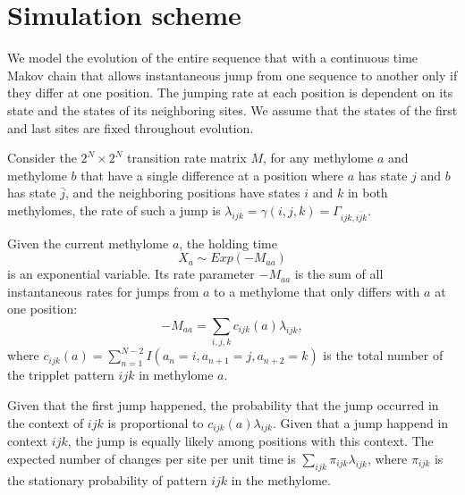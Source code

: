 \documentclass[11pt]{article}
\begin{document}
\section{Simulation scheme}

We model the evolution of the entire sequence that with a continuous
time Makov chain that allows instantaneous jump from one sequence to
another only if they differ at one position. The jumping rate at each
position is dependent on its state and the states of its neighboring
sites. We assume that the states of the first and last sites are
fixed throughout evolution.

Consider the $2^N \times 2^N$ transition rate matrix $M$, for any
methylome $a$ and methylome $b$ that have a single difference at a
position where $a$ has state $j$ and $b$ has state $\bar{j}$, and the
neighboring positions have states $i$ and $k$ in both methylomes, the
rate of such a jump is $\lambda_{ijk} = \gamma(i, j, k) = \Gamma_{ijk,
i\bar{j}k}$.

Given the current methylome $a$, the holding time
\[
  X_a\sim Exp(-M_{aa})
\]
is an exponential variable. Its rate parameter $-M_{aa}$ is the
sum of all instantaneous rates for jumps from $a$ to a methylome that
only differs with $a$ at one position:
\[
  -M_{aa} =  \sum\limits_{i,j,k}c_{ijk}(a)\lambda_{ijk},
\]
where $c_{ijk}(a) = \sum_{n=1}^{N-2}I(a_{n}=i, a_{n+1}=j, a_{n+2}=k)$
is the total number of the tripplet pattern $ijk$ in methylome $a$.

Given that the first jump happened, the probability that the jump
occurred in the context of $ijk$ is proportional to
$c_{ijk}(a)\lambda_{ijk}$. Given that a jump happend in context $ijk$,
the jump is equally likely among positions with this context.
The expected number of changes per site per unit time is
$\sum\limits_{ijk}\pi_{ijk}\lambda_{ijk}$, where $\pi_{ijk}$ is the
stationary probability of pattern $ijk$ in the methylome.
\end{document}
